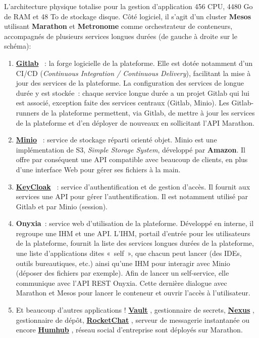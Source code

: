 L'architecture physique totalise pour la gestion d'application 456 CPU, 4480 Go de RAM et 48 To de stockage disque. Côté logiciel, il s'agit d'un cluster \textbf{Mesos} utilisant \textbf{Marathon} et \textbf{Metronome} comme orchestrateur de conteneurs, accompagnés de plusieurs services longues durées (de gauche à droite sur le schéma):
\begin{enumerate}
    \item \href{https://about.gitlab.com/}{\textbf{Gitlab}} \cite{gitlab}~: la forge logicielle de la plateforme. Elle est dotée notamment d'un CI/CD (\textit{Continuous Integration / Continuous Delivery}), facilitant la mise à jour des services de la plateforme. La configuration des services de longue durée y est stockée~: chaque service longue durée a un projet Gitlab qui lui est associé, exception faite des services centraux (Gitlab, Minio). Les Gitlab-runners de la plateforme permettent, via Gitlab, de mettre à jour les services de la plateforme et d'en déployer de nouveaux en sollicitant l'API Marathon.
    \vspace{5pt}
    \item \href{https://min.io/}{\textbf{Minio}} \cite{minio}~: service de stockage réparti orienté objet. Minio est une implémentation de S3, \textit{Simple Storage System}, développé par \textbf{Amazon}. Il offre par conséquent une API compatible avec beaucoup de clients, en plus d'une interface Web pour gérer ses fichiers à la main.
    \vspace{5pt}
    \item \href{https://www.keycloak.org/}{\textbf{KeyCloak}} \cite{keycloak}~: service d'authentification et de gestion d'accès. Il fournit aux services une API pour gérer l'authentification. Il est notamment utilisé par Gitlab et par Minio (session).
    \vspace{5pt}
    \item \textbf{Onyxia}~: service web d'utilisation de la plateforme. Développé en interne, il regroupe une IHM et une API. L'IHM, portail d'entrée pour les utilisateurs de la plateforme, fournit la liste des services longues durées de la plateforme, une liste d'applications dites «~self~», que chacun peut lancer (des IDEs, outils bureautiques, etc.) ainsi qu'une IHM pour interagir avec Minio (déposer des fichiers par exemple). Afin de lancer un self-service, elle communique avec l'API REST Onyxia. Cette dernière dialogue avec Marathon et Mesos pour lancer le conteneur et ouvrir l'accès à l'utilisateur.
    \vspace{5pt}
    \item Et beaucoup d'autres applications ! \href{https://www.vaultproject.io/}{\textbf{Vault}} \cite{vault}, gestionnaire de secrets, \href{https://fr.sonatype.com/nexus-repository-sonatype}{\textbf{Nexus}} \cite{nexus}, gestionnaire de dépôt, \href{https://rocket.chat/}{\textbf{RocketChat}} \cite{rocketchat}, serveur de messagerie instantanée ou encore \href{https://humhub.org}{\textbf{Humhub}} \cite{humhub}, réseau social d'entreprise sont déployés sur Marathon.
    \newline
\end{enumerate}

